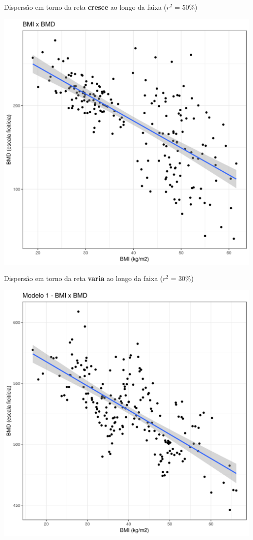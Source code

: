 \documentclass{beamer}
\begin{document}
\begin{frame}{\scriptsize Dispersão em torno da reta {\bf cresce} ao longo da faixa ($r^2$ = 50\%)}
  \begin{center}
    \includegraphics[height=.9\textheight]{Cap18-19/pratica-rls-het}
  \end{center}
\end{frame}

\begin{frame}{\scriptsize Dispersão em torno da reta {\bf varia} ao longo da faixa ($r^2$ = 30\%)}
  \begin{center}
    \includegraphics[height=.9\textheight]{Cap31-32/pratica-rlm1}
  \end{center}
\end{frame}
\end{document}
